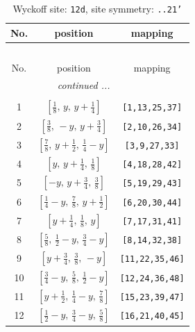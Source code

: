\documentclass[fleqn,8pt]{jsarticle}
\begin{document}
\begin{longtable}{ccc}
\caption{Wyckoff site: {\tt 12d}, site symmetry: {\tt ..21'}}
 \\
 \hline \hline
No. & position & mapping \\ \hline \endfirsthead

\multicolumn{2}{l}{\tablename\ \thetable{}} \\
 \hline \hline
No. & position & mapping \\ \hline \endhead

 \hline \hline
\multicolumn{2}{r}{\footnotesize\it continued ...} \\ \endfoot

 \hline \hline
\multicolumn{2}{r}{} \\ \endlastfoot

1 & $\left[ \frac{1}{8},\, y,\, y + \frac{1}{4} \right]$ & {\tt [1,13,25,37]} \\ \hline
2 & $\left[ \frac{3}{8},\, - y,\, y + \frac{3}{4} \right]$ & {\tt [2,10,26,34]} \\ \hline
3 & $\left[ \frac{7}{8},\, y + \frac{1}{2},\, \frac{1}{4} - y \right]$ & {\tt [3,9,27,33]} \\ \hline
4 & $\left[ y,\, y + \frac{1}{4},\, \frac{1}{8} \right]$ & {\tt [4,18,28,42]} \\ \hline
5 & $\left[ - y,\, y + \frac{3}{4},\, \frac{3}{8} \right]$ & {\tt [5,19,29,43]} \\ \hline
6 & $\left[ \frac{1}{4} - y,\, \frac{7}{8},\, y + \frac{1}{2} \right]$ & {\tt [6,20,30,44]} \\ \hline
7 & $\left[ y + \frac{1}{4},\, \frac{1}{8},\, y \right]$ & {\tt [7,17,31,41]} \\ \hline
8 & $\left[ \frac{5}{8},\, \frac{1}{2} - y,\, \frac{3}{4} - y \right]$ & {\tt [8,14,32,38]} \\ \hline
9 & $\left[ y + \frac{3}{4},\, \frac{3}{8},\, - y \right]$ & {\tt [11,22,35,46]} \\ \hline
10 & $\left[ \frac{3}{4} - y,\, \frac{5}{8},\, \frac{1}{2} - y \right]$ & {\tt [12,24,36,48]} \\ \hline
11 & $\left[ y + \frac{1}{2},\, \frac{1}{4} - y,\, \frac{7}{8} \right]$ & {\tt [15,23,39,47]} \\ \hline
12 & $\left[ \frac{1}{2} - y,\, \frac{3}{4} - y,\, \frac{5}{8} \right]$ & {\tt [16,21,40,45]} \\
\end{longtable}
\renewcommand{\arraystretch}{1.2}
\end{document}

